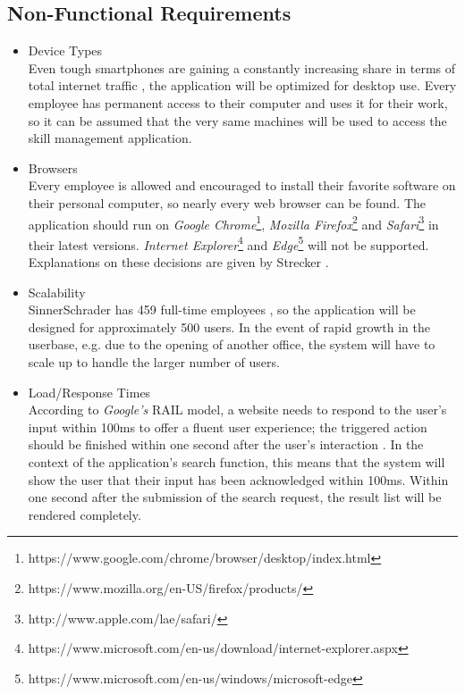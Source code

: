 \newpage

\subsection{Non-Functional Requirements}
\begin{itemize}
	\item Device Types\\
		Even tough smartphones are gaining a constantly increasing share in terms of total internet traffic \cite{allthemobile},
		the application will be optimized for desktop use. Every employee has permanent access to their computer and uses it
		for their work, so it can be assumed that the very same machines will be used to access the skill management application.
	\item Browsers\\
		Every employee is allowed and encouraged to install their favorite software on their personal computer, so nearly every web browser can be found.
		The application should run on \textit{Google Chrome}\footnote{https://www.google.com/chrome/browser/desktop/index.html}, \textit{Mozilla Firefox}\footnote{https://www.mozilla.org/en-US/firefox/products/} and \textit{Safari}\footnote{http://www.apple.com/lae/safari/} in their latest versions. \textit{Internet Explorer}\footnote{https://www.microsoft.com/en-us/download/internet-explorer.aspx} and \textit{Edge}\footnote{https://www.microsoft.com/en-us/windows/microsoft-edge} will not be supported. Explanations on these decisions are given by Strecker \cite{strecker}.
	\item Scalability\\
		SinnerSchrader has 459 full-time employees \cite{quartalsbericht}, so the application will be designed for approximately 500 users. In the event of rapid growth in the userbase, e.g. due to the opening of another office, the system will have to scale up to handle the larger number of users.
	\item Load/Response Times\\
		According to \textit{Google's} RAIL model, a website needs to respond to the user's input within 100ms to offer a fluent user experience; the triggered action should be finished within one second after the user's interaction \cite{RAIL}. In the context of the application's search function, this means that the system will show the user that their input has been acknowledged within 100ms. Within one second after the submission of the search request, the result list will be rendered completely. 	\label{require_times}
\end{itemize}



